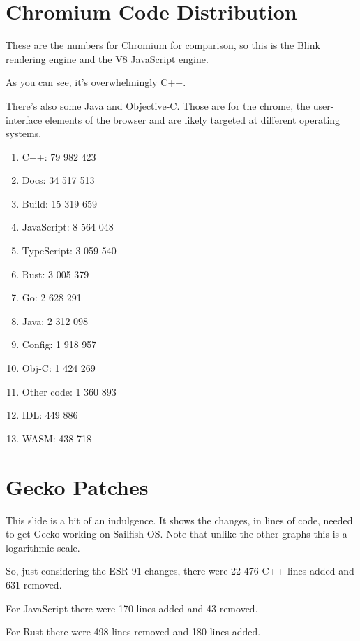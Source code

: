 \documentclass{article}
\begin{document}

\section{Chromium Code Distribution}

These are the numbers for Chromium for comparison, so this is the Blink rendering engine and the V8 JavaScript engine.

As you can see, it's overwhelmingly C++.

There's also some Java and Objective-C. Those are for the chrome, the user-interface elements of the browser and are likely targeted at different operating systems.

\begin{enumerate}
\item C++: 79 982 423
\item Docs: 34 517 513
\item Build: 15 319 659
\item JavaScript: 8 564 048
\item TypeScript: 3 059 540
\item Rust: 3 005 379
\item Go: 2 628 291
\item Java: 2 312 098
\item Config: 1 918 957
\item Obj-C: 1 424 269
\item Other code: 1 360 893
\item IDL: 449 886
\item WASM: 438 718
\end{enumerate}


\section{Gecko Patches}

This slide is a bit of an indulgence. It shows the changes, in lines of code, needed to get Gecko working on Sailfish OS. Note that unlike the other graphs this is a logarithmic scale.

So, just considering the ESR 91 changes, there were 22 476 C++ lines added and 631 removed.

For JavaScript there were 170 lines added and 43 removed.

For Rust there were 498 lines removed and 180 lines added.
\end{document}
